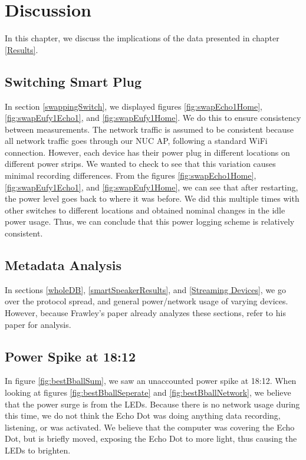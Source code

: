 \chapter{Discussion}
\label{Discussion}
In this chapter, we discuss the implications of the data presented in chapter \ref{Results}.

\section{Switching Smart Plug}
In section \ref{swappingSwitch}, we displayed figures \ref{fig:swapEcho1Home}, \ref{fig:swapEufy1Echo1}, and \ref{fig:swapEufy1Home}. We do this to ensure consistency between measurements. The network traffic is assumed to be consistent because all network traffic goes through our NUC AP, following a standard WiFi connection. However, each device has their power plug in different locations on different power strips. We wanted to check to see that this variation causes minimal recording differences. From the figures \ref{fig:swapEcho1Home}, \ref{fig:swapEufy1Echo1}, and \ref{fig:swapEufy1Home}, we can see that after restarting, the power level goes back to where it was before. We did this multiple times with other switches to different locations and obtained nominal changes in the idle power usage. Thus, we can conclude that this power logging scheme is relatively consistent.

\section{Metadata Analysis}
In sections \ref{wholeDB}, \ref{smartSpeakerResults}, and \ref{Streaming Devices}, we go over the protocol spread, and general power/network usage of varying devices. However, because Frawley's paper \cite{frawley_2018} already analyzes these sections, refer to his paper for analysis.

\section{Power Spike at 18:12}
In figure \ref{fig:bestBballSum}, we saw an unaccounted power spike at 18:12. When looking at figures \ref{fig:bestBballSeperate} and \ref{fig:bestBballNetwork}, we believe that the power surge is from the LEDs. Because there is no network usage during this time, we do not think the Echo Dot was doing anything data recording, listening, or was activated. We believe that the computer was covering the Echo Dot, but is briefly moved, exposing the Echo Dot to more light, thus causing the LEDs to brighten.


